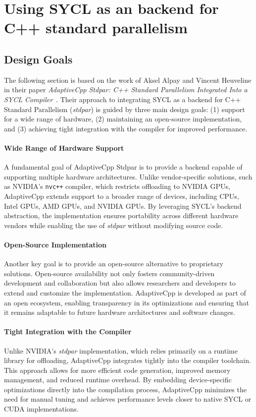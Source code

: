 
\section{Using SYCL as an backend for C++ standard parallelism}




\subsection{Design Goals}
\label{sec:design_goals}

The following section is based on the work of Aksel Alpay and Vincent Heuveline in their paper
\textit{AdaptiveCpp Stdpar: C++ Standard Parallelism Integrated Into a SYCL Compiler}~\cite{alpay2021}.
Their approach to integrating SYCL as a backend for C++ Standard Parallelism (\textit{stdpar}) is guided
by three main design goals: (1) support for a wide range of hardware, (2) maintaining an open-source
implementation, and (3) achieving tight integration with the compiler for improved performance.

\paragraph{Wide Range of Hardware Support}
A fundamental goal of AdaptiveCpp Stdpar is to provide a backend capable of supporting multiple hardware
architectures. Unlike vendor-specific solutions, such as NVIDIA’s \texttt{nvc++} compiler, which restricts
offloading to NVIDIA GPUs, AdaptiveCpp extends support to a broader range of devices, including CPUs,
Intel GPUs, AMD GPUs, and NVIDIA GPUs. By leveraging SYCL’s backend abstraction, the implementation
ensures portability across different hardware vendors while enabling the use of \textit{stdpar} without
modifying source code.

\paragraph{Open-Source Implementation}
Another key goal is to provide an open-source alternative to proprietary solutions. Open-source availability
not only fosters community-driven development and collaboration but also allows researchers and developers
to extend and customize the implementation. AdaptiveCpp is developed as part of an open ecosystem, enabling
transparency in its optimizations and ensuring that it remains adaptable to future hardware architectures
and software changes.

\paragraph{Tight Integration with the Compiler}
Unlike NVIDIA’s \textit{stdpar} implementation, which relies primarily on a runtime library for offloading,
AdaptiveCpp integrates tightly into the compiler toolchain. This approach allows for more efficient code
generation, improved memory management, and reduced runtime overhead. By embedding device-specific
optimizations directly into the compilation process, AdaptiveCpp minimizes the need for manual tuning and
achieves performance levels closer to native SYCL or CUDA implementations.

